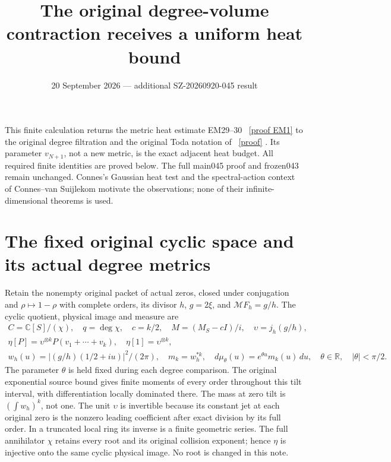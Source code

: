 \documentclass[11pt]{article}
\title{The original degree-volume contraction receives a uniform heat bound}
\author{}\date{20 September 2026 --- additional SZ-20260920-045 result}
\newcommand{\C}{\mathbb C}\newcommand{\R}{\mathbb R}
\begin{document}
\maketitle

This finite calculation returns the metric heat estimate EM29--30
\cite{EM}%
~\href{https://github.com/KokunoYumeto/zeta-function-research-reader/blob/5992ad50c0f2a06921f1fcaded7b4e38097c0739/workbenches/splitzero-tandem/continuations/20260920-original-kernel-mixed-determinants/providers/ENDPOINT_METRIC_HEAT.tex\#L38}{[proof EM1]}%
{} to the original degree filtration and the original Toda
notation of \cite{TV}%
~\href{https://github.com/KokunoYumeto/zeta-function-research-reader/blob/5992ad50c0f2a06921f1fcaded7b4e38097c0739/workbenches/splitzero-tandem/continuations/20260920-original-kernel-mixed-determinants/providers/TODA_VOLUME_CONTROL.tex\#L1}{[proof]}%
{}. Its parameter \(v_{N+1}\), not a new metric,
is the exact adjacent heat budget. All required finite identities are
proved below. The full main045 proof and frozen043 remain unchanged.
Connes's Gaussian heat test \cite{Connes} and the spectral-action
context of Connes--van Suijlekom \cite{CV} motivate the observations;
none of their infinite-dimensional theorems is used.

\section{The fixed original cyclic space and its actual degree metrics}

Retain the nonempty original packet of actual zeros, closed under
conjugation and \(\rho\mapsto1-\rho\) with complete orders, its divisor
\(h\), \(g=2\xi\), and \(\mathcal MF_h=g/h\).
The cyclic quotient, physical image and measure are
\begin{equation}\tag{VH1}\label{VH1}
\begin{gathered}
C=\C[S]/(\chi),\quad q=\deg\chi,\quad c=k/2,\quad
M=(M_S-cI)/i,\quad \upsilon=j_h(g/h),\\
\eta[P]=\upsilon^{\otimes k}P(v_1+\cdots+v_k),\quad
\eta[1]=\upsilon^{\otimes k},\\
w_h(u)=|(g/h)(1/2+iu)|^2/(2\pi),\quad m_k=w_h^{*k},\quad
d\mu_\theta(u)=e^{\theta u}m_k(u)\,du,
\quad\theta\in\R,\quad|\theta|<\pi/2.
\end{gathered}
\end{equation}
The parameter \(\theta\) is held fixed during each degree comparison.
The original exponential source bound gives finite moments of every
order throughout this tilt interval, with differentiation locally
dominated there. The mass at zero tilt is \((\int w_h)^k\), not one.
The unit \(\upsilon\) is invertible because its constant jet at each
original zero is the nonzero leading coefficient after exact division
by its full order. In a truncated local ring its inverse is a finite
geometric series. The full annihilator \(\chi\) retains every root
and its original collision exponent; hence \(\eta\) is injective
onto the same cyclic physical image. No root is changed in this note.
\end{document}
